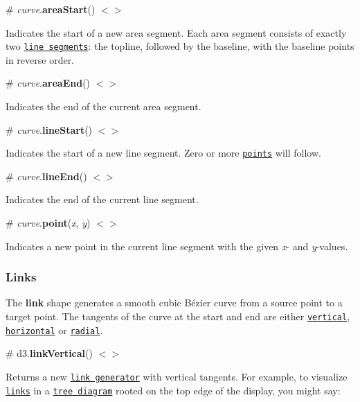 \label{_curve_areaStart}%
\# {\itshape curve}.{\bfseries area\+Start}() \href{https://github.com/d3/d3-shape/blob/master/src/curve/step.js#L7}{\tt $<$$>$}

Indicates the start of a new area segment. Each area segment consists of exactly two \href{#curve_lineStart}{\tt line segments}\+: the topline, followed by the baseline, with the baseline points in reverse order.

\label{_curve_areaEnd}%
\# {\itshape curve}.{\bfseries area\+End}() \href{https://github.com/d3/d3-shape/blob/master/src/curve/step.js#L10}{\tt $<$$>$}

Indicates the end of the current area segment.

\label{_curve_lineStart}%
\# {\itshape curve}.{\bfseries line\+Start}() \href{https://github.com/d3/d3-shape/blob/master/src/curve/step.js#L13}{\tt $<$$>$}

Indicates the start of a new line segment. Zero or more \href{#curve_point}{\tt points} will follow.

\label{_curve_lineEnd}%
\# {\itshape curve}.{\bfseries line\+End}() \href{https://github.com/d3/d3-shape/blob/master/src/curve/step.js#L17}{\tt $<$$>$}

Indicates the end of the current line segment.

\label{_curve_point}%
\# {\itshape curve}.{\bfseries point}({\itshape x}, {\itshape y}) \href{https://github.com/d3/d3-shape/blob/master/src/curve/step.js#L22}{\tt $<$$>$}

Indicates a new point in the current line segment with the given {\itshape x}-\/ and {\itshape y}-\/values.

\subsubsection*{Links}

\href{http://bl.ocks.org/mbostock/9d0899acb5d3b8d839d9d613a9e1fe04}{\tt }

The {\bfseries link} shape generates a smooth cubic Bézier curve from a source point to a target point. The tangents of the curve at the start and end are either \href{#linkVertical}{\tt vertical}, \href{#linkHorizontal}{\tt horizontal} or \href{#linkRadial}{\tt radial}.

\label{_linkVertical}%
\# d3.{\bfseries link\+Vertical}() \href{https://github.com/d3/d3-shape/blob/master/src/link/index.js#L74}{\tt $<$$>$}

Returns a new \href{#_link}{\tt link generator} with vertical tangents. For example, to visualize \href{https://github.com/d3/d3-hierarchy/blob/master/README.md#node_links}{\tt links} in a \href{https://github.com/d3/d3-hierarchy/blob/master/README.md#tree}{\tt tree diagram} rooted on the top edge of the display, you might say\+:


